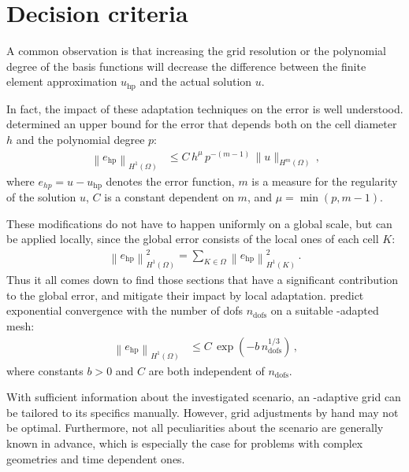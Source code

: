 \section{Decision criteria}
\label{sec:decision}

A common observation is that increasing the grid resolution or the polynomial degree of the basis functions will decrease the difference between the finite element approximation $u_\text{hp}$ and the actual solution $u$.

In fact, the impact of these adaptation techniques on the error is well understood. \textcite[theorem 3.4]{babuska1990} determined an upper bound for the error that depends both on the cell diameter $h$ and the polynomial degree $p$:
\begin{align}
\label{eq:errorbound_hp} \left\|e_\text{hp}\right\|_{H^{1}(\Omega)} &\leq C \, h^{\mu} \, p^{-(m-1)} \, \|u\|_{H^{m}(\Omega)} \,\text{,}
\end{align}
where $e_{hp} = u - u_\text{hp}$ denotes the error function, $m$ is a measure for the regularity of the solution $u$, $C$ is a constant dependent on $m$, and $\mu = \min \left(p, m - 1\right)$.

These modifications do not have to happen uniformly on a global scale, but can be applied locally, since the global error consists of the local ones of each cell $K$:
\begin{align}
\label{eq:error_sum} \left\|e_\text{hp}\right\|_{H^1(\Omega)}^2 = \sum\limits_{K \in \Omega} \left\|e_\text{hp}\right\|_{H^1(K)}^2 \,\text{.}
\end{align}
Thus it all comes down to find those sections that have a significant contribution to the global error, and mitigate their impact by local adaptation. \textcite[theorem 5.1]{guo1986} predict exponential convergence with the number of \glspl{dof} $n_\text{dofs}$ on a suitable \hp-adapted mesh:
\begin{align}
\label{eq:errorbound_exp} \left\|e_\text{hp}\right\|_{H^{1}(\Omega)} &\leq C \, \exp\left(- b \, n_\text{dofs}^{1 / 3}\right) \,\text{,}
\end{align}
where constants $b > 0$ and $C$ are both independent of $n_\text{dofs}$.

With sufficient information about the investigated scenario, an \hp-adaptive grid can be tailored to its specifics manually. However, grid adjustments by hand may not be optimal. Furthermore, not all peculiarities about the scenario are generally known in advance, which is especially the case for problems with complex geometries and time dependent ones.

